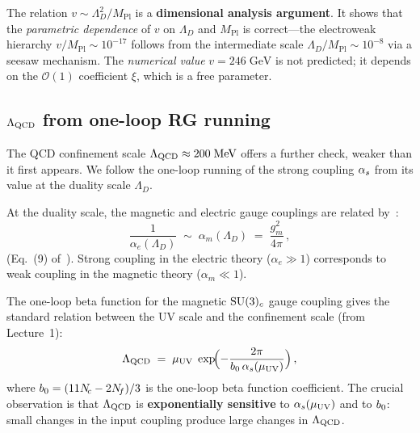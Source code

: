 \documentclass[11pt,a4paper]{article}
\begin{document}
\begin{warningbox}[title={Parametric consistency, not prediction}]
  The relation $v \sim \Lambda_D^2 / M_{\text{Pl}}$ is a
  \textbf{dimensional analysis argument}.  It shows that the
  \emph{parametric dependence} of $v$ on $\Lambda_D$ and
  $M_{\text{Pl}}$ is correct---the electroweak hierarchy
  $v / M_{\text{Pl}} \sim 10^{-17}$ follows from the intermediate
  scale $\Lambda_D / M_{\text{Pl}} \sim 10^{-8}$ via a seesaw
  mechanism.  The \emph{numerical value} $v = 246\;\text{GeV}$ is not
  predicted; it depends on the $\mathcal{O}(1)$ coefficient $\xi$,
  which is a free parameter.
\end{warningbox}

\subsection{$\Lambda_{\mathrm{QCD}}$ from one-loop RG running}
\label{ssec:lambda-qcd}

The QCD confinement scale $\Lambda_{\mathrm{QCD}} \approx 200\;\text{MeV}$
offers a further check, weaker than it first appears.  We follow the
one-loop running of the strong coupling $\alpha_s$ from its value at the
duality scale $\Lambda_D$.

At the duality scale, the magnetic and electric gauge couplings are
related by~\cite{CacciapagliaSannino2024}:
\begin{equation}\label{eq:coupling-duality}
  \frac{1}{\alpha_e(\Lambda_D)}
  \;\sim\; \alpha_m(\Lambda_D)
  \;=\; \frac{g_m^2}{4\pi}\,,
\end{equation}
(Eq.~(9) of~\cite{CacciapagliaSannino2024}).
Strong coupling in the electric theory ($\alpha_e \gg 1$) corresponds
to weak coupling in the magnetic theory ($\alpha_m \ll 1$).

The one-loop beta function for the magnetic $\mathrm{SU}(3)_c$ gauge coupling
gives the standard relation between the UV scale and the confinement
scale (from Lecture~1):
\begin{equation}\label{eq:rg-running}
  \Lambda_{\mathrm{QCD}}
  \;=\; \mu_{\mathrm{UV}} \;\exp\!\Bigl(
    -\frac{2\pi}{b_0\,\alpha_s(\mu_{\mathrm{UV}})}
  \Bigr)\,,
\end{equation}
where $b_0 = (11N_{\!c} - 2N_{\!f})/3$ is the one-loop beta function
coefficient.  The crucial observation is that $\Lambda_{\mathrm{QCD}}$ is
\textbf{exponentially sensitive} to $\alpha_s(\mu_{\mathrm{UV}})$ and to
$b_0$: small changes in the input coupling produce large changes in
$\Lambda_{\mathrm{QCD}}$.
\end{document}
